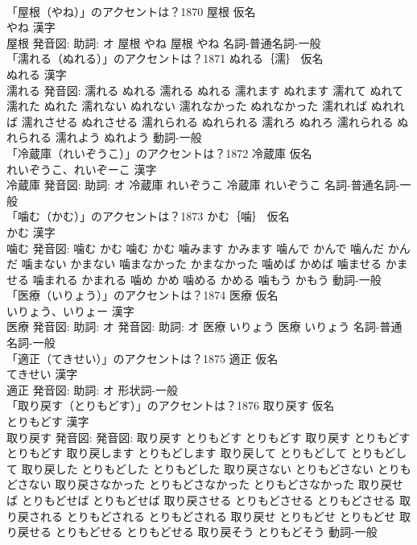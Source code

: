 \documentclass[8pt]{extreport}
\begin{document}
\begin{CJK}{UTF8}{min}
\\	「屋根（やね）」のアクセントは？1870	屋根 仮名　
\\	やね 漢字　
\\	屋根 発音図: 助詞: オ	屋根 やね		屋根 やね				名詞-普通名詞-一般 
\\	「濡れる（ぬれる）」のアクセントは？1871	ぬれる｛濡｝ 仮名　
\\	ぬれる 漢字　
\\	濡れる 発音図:	濡れる ぬれる		濡れる ぬれる 濡れます ぬれます 濡れて ぬれて 濡れた ぬれた 濡れない ぬれない 濡れなかった ぬれなかった 濡れれば ぬれれば 濡れさせる ぬれさせる 濡れられる ぬれられる 濡れろ ぬれろ 濡れられる ぬれられる 濡れよう ぬれよう				動詞-一般 
\\	「冷蔵庫（れいぞうこ）」のアクセントは？1872	冷蔵庫 仮名　
\\	れいぞうこ、れいぞーこ 漢字　
\\	冷蔵庫 発音図: 助詞: オ	冷蔵庫 れいぞうこ		冷蔵庫 れいぞうこ				名詞-普通名詞-一般 
\\	「噛む（かむ）」のアクセントは？1873	かむ｛噛｝ 仮名　
\\	かむ 漢字　
\\	噛む 発音図:	噛む かむ		噛む かむ 噛みます かみます 噛んで かんで 噛んだ かんだ 噛まない かまない 噛まなかった かまなかった 噛めば かめば 噛ませる かませる 噛まれる かまれる 噛め かめ 噛める かめる 噛もう かもう				動詞-一般 
\\	「医療（いりょう）」のアクセントは？1874	医療 仮名　
\\	いりょう、いりょー 漢字　
\\	医療 発音図: 助詞: オ 発音図: 助詞: オ	医療 いりょう		医療 いりょう				名詞-普通名詞-一般 
\\	「適正（てきせい）」のアクセントは？1875	適正 仮名　
\\	てきせい 漢字　
\\	適正 発音図: 助詞: オ							形状詞-一般 
\\	「取り戻す（とりもどす）」のアクセントは？1876	取り戻す 仮名　
\\	とりもどす 漢字　
\\	取り戻す 発音図: 発音図:	取り戻す とりもどす とりもどす		取り戻す とりもどす とりもどす 取り戻します とりもどします 取り戻して とりもどして とりもどして 取り戻した とりもどした とりもどした 取り戻さない とりもどさない とりもどさない 取り戻さなかった とりもどさなかった とりもどさなかった 取り戻せば とりもどせば とりもどせば 取り戻させる とりもどさせる とりもどさせる 取り戻される とりもどされる とりもどされる 取り戻せ とりもどせ とりもどせ 取り戻せる とりもどせる とりもどせる 取り戻そう とりもどそう				動詞-一般 

\end{CJK}
\end{document}
